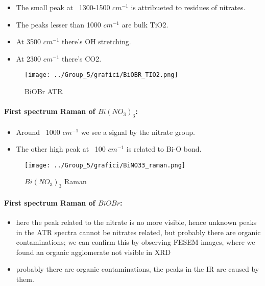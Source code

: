\begin{itemize}
    \item The small peak at ~1300-1500 $cm^{-1}$ is attribueted to residues of nitrates.
    \item The peaks lesser than 1000 $cm^{-1}$ are bulk TiO2.
    \item At 3500 $cm^{-1}$ there's OH stretching.
    \item At 2300 $cm^{-1}$ there's CO2.
\end{itemize}

\begin{figure}[ht]
    \centering
    \texttt{[image: ../Group\_5/grafici/BiOBR\_TIO2.png]}
    \caption{BiOBr ATR}
\end{figure}

\newpage
\paragraph{First spectrum Raman of $Bi(NO_3)_3$:}

\begin{itemize}
    \item Around ~1000 $cm^{-1}$ we see a signal by the nitrate group.
    \item The other high peak at ~100 $cm^{-1}$ is related to Bi-O bond. 
\end{itemize}

\begin{figure}[ht]
    \centering
    \texttt{[image: ../Group\_5/grafici/BiNO33\_raman.png]}
    \caption{$Bi(NO_3)_3$ Raman}
\end{figure}

\newpage
\paragraph{First spectrum Raman of $BiOBr$:}

\begin{itemize}
    \item here the peak related to the nitrate is no more visible, hence unknown peaks in the ATR spectra cannot be nitrates related, but probably there are organic contaminations; we can confirm this by observing FESEM images, where we found an organic agglomerate not visible in XRD
    \item probably there are organic contaminations, the peaks in the IR are caused by them. 
\end{itemize}

